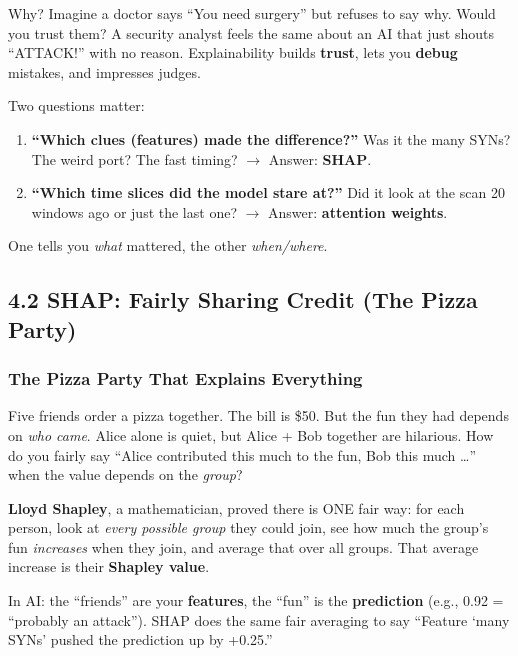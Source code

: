 \documentclass[11pt,a4paper]{article}
\begin{document}
Why? Imagine a doctor says ``You need surgery'' but refuses to say why. Would
you trust them? A security analyst feels the same about an AI that just shouts
``ATTACK!'' with no reason. Explainability builds \textbf{trust}, lets you
\textbf{debug} mistakes, and impresses judges.

Two questions matter:

\begin{enumerate}[leftmargin=1.8em,itemsep=2pt]
  \item \textbf{``Which clues (features) made the difference?''}
        Was it the many SYNs? The weird port? The fast timing? $\to$ Answer:
        \textbf{SHAP}.

  \item \textbf{``Which time slices did the model stare at?''}
        Did it look at the scan 20 windows ago or just the last one?
        $\to$ Answer: \textbf{attention weights}.
\end{enumerate}

One tells you \emph{what} mattered, the other \emph{when/where}.

\subsection{4.2 SHAP: Fairly Sharing Credit (The Pizza Party)}
\label{sec:shap}

\subsubsection{The Pizza Party That Explains Everything}

\begin{storybox}
Five friends order a pizza together. The bill is \$50. But the fun they had
depends on \emph{who came}. Alice alone is quiet, but Alice + Bob together are
hilarious. How do you fairly say ``Alice contributed this much to the fun,
Bob this much \dots'' when the value depends on the \emph{group}?

\textbf{Lloyd Shapley}, a mathematician, proved there is ONE fair way: for each
person, look at \emph{every possible group} they could join, see how much the
group's fun \emph{increases} when they join, and average that over all groups.
That average increase is their \textbf{Shapley value}.

In AI: the ``friends'' are your \textbf{features}, the ``fun'' is the
\textbf{prediction} (e.g., 0.92 = ``probably an attack''). SHAP does the same
fair averaging to say ``Feature `many SYNs' pushed the prediction up by +0.25.''
\end{storybox}
\end{document}
